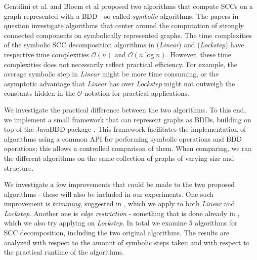 \documentclass[../master/master.tex]{subfiles}
\begin{document}
Gentilini et al. \cite{linear} and Bloem et al \cite{lockstep} proposed two algorithms that compute SCCs on a graph represented with a BDD - so called \emph{symbolic} algorithms. The papers in question investigate algorithms that center around the computation of strongly connected components on symbolically represented graphs. The time complexities of the symbolic SCC decomposition algorithms in \cite{linear} (\textit{Linear}) and \cite{lockstep} (\textit{Lockstep}) have respective time complexities $\mathcal{O}(n)$ and $\mathcal{O}(n \log n)$. However, these time complexities does not necessarily reflect practical efficiency. For example, the average symbolic step in \textit{Linear} might be more time consuming, or the asymptotic advantage that \textit{Linear} has over \textit{Lockstep} might not outweigh the constants hidden in the $\mathcal{O} $-notation for practical applications. 

We investigate the practical difference between the two algorithms. To this end, we implement a small framework that can represent graphs as BDDs, building on top of the JavaBDD package \cite{whaley}. This framework facilitates the implementation of algorithms using a common API for performing symbolic operations and BDD operations; this allows a controlled comparison of them. 
When comparing, we ran the different algorithms on the same collection of graphs of varying size and structure.

We investigate a few improvements that could be made to the two proposed algorithms - these will also be included in our experiments. One such improvement is \textit{trimming}, suggested in \cite{lockstep}, which we apply to both \textit{Linear} and \textit{Lockstep}. Another one is \textit{edge restriction} - something that is done already in \cite{linear}, which we also try applying on \textit{Lockstep}. In total we examine 5 algorithms for SCC decomposition, including the two original algorithms. The results are analyzed with respect to the amount of symbolic steps taken and with respect to the practical runtime of the algorithms.
\end{document}

